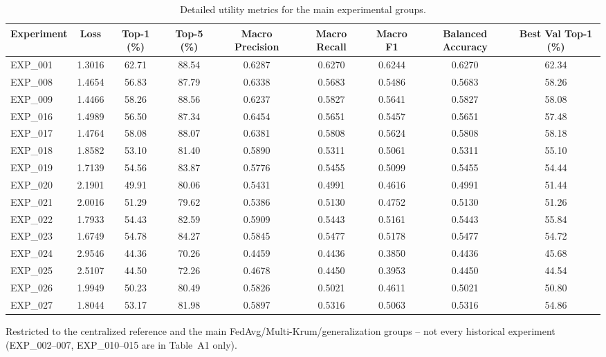 \begin{table}[t]
\centering
\caption{Detailed utility metrics for the main experimental groups.}
\label{tab:utility}
\begin{tabular}{lcccccccc}
\toprule
Experiment & Loss & Top-1 (\%) & Top-5 (\%) & Macro Precision & Macro Recall & Macro F1 & Balanced Accuracy & Best Val Top-1 (\%) \\
\midrule
EXP\_001 & 1.3016 & 62.71 & 88.54 & 0.6287 & 0.6270 & 0.6244 & 0.6270 & 62.34 \\
EXP\_008 & 1.4654 & 56.83 & 87.79 & 0.6338 & 0.5683 & 0.5486 & 0.5683 & 58.26 \\
EXP\_009 & 1.4466 & 58.26 & 88.56 & 0.6237 & 0.5827 & 0.5641 & 0.5827 & 58.08 \\
EXP\_016 & 1.4989 & 56.50 & 87.34 & 0.6454 & 0.5651 & 0.5457 & 0.5651 & 57.48 \\
EXP\_017 & 1.4764 & 58.08 & 88.07 & 0.6381 & 0.5808 & 0.5624 & 0.5808 & 58.18 \\
EXP\_018 & 1.8582 & 53.10 & 81.40 & 0.5890 & 0.5311 & 0.5061 & 0.5311 & 55.10 \\
EXP\_019 & 1.7139 & 54.56 & 83.87 & 0.5776 & 0.5455 & 0.5099 & 0.5455 & 54.44 \\
EXP\_020 & 2.1901 & 49.91 & 80.06 & 0.5431 & 0.4991 & 0.4616 & 0.4991 & 51.44 \\
EXP\_021 & 2.0016 & 51.29 & 79.62 & 0.5386 & 0.5130 & 0.4752 & 0.5130 & 51.26 \\
EXP\_022 & 1.7933 & 54.43 & 82.59 & 0.5909 & 0.5443 & 0.5161 & 0.5443 & 55.84 \\
EXP\_023 & 1.6749 & 54.78 & 84.27 & 0.5845 & 0.5477 & 0.5178 & 0.5477 & 54.72 \\
EXP\_024 & 2.9546 & 44.36 & 70.26 & 0.4459 & 0.4436 & 0.3850 & 0.4436 & 45.68 \\
EXP\_025 & 2.5107 & 44.50 & 72.26 & 0.4678 & 0.4450 & 0.3953 & 0.4450 & 44.54 \\
EXP\_026 & 1.9949 & 50.23 & 80.49 & 0.5826 & 0.5021 & 0.4611 & 0.5021 & 50.80 \\
EXP\_027 & 1.8044 & 53.17 & 81.98 & 0.5897 & 0.5316 & 0.5063 & 0.5316 & 54.86 \\
\bottomrule
\end{tabular}
\vspace{2pt}\par\raggedright\footnotesize Restricted to the centralized reference and the main FedAvg/Multi-Krum/generalization groups -- not every historical experiment (EXP\_002--007, EXP\_010--015 are in Table~A1 only).
\end{table}
